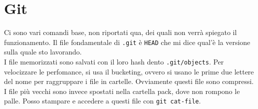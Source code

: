 \documentclass[a4paper,12pt]{article}
\begin{document}
\section{Git}
Ci sono vari comandi base, non riportati qua, dei quali non verrà spiegato il funzionamento.
Il file fondamentale di \texttt{.git} è \texttt{HEAD} che mi dice qual'è la versione sulla quale sto lavorando.\\
I file memorizzati sono salvati con il loro hash dento \texttt{.git/objects}. Per velocizzare le perfomance, si usa il bucketing, ovvero si usano le prime due lettere del nome per raggruppare i file in cartelle. Ovviamente questi file sono compressi. I file più vecchi sono invece spostati nella cartella pack, dove non rompono le palle. Posso stampare e accedere a questi file con \texttt{git cat-file}.
\end{document}
